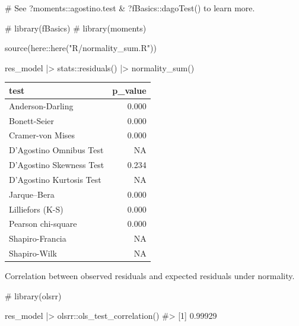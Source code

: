 \documentclass[
  12pt,
  a4paper,
  oneside]{tesesusp}
\newenvironment{Shaded}{\begin{snugshade}}{\end{snugshade}}
\newcommand{\CommentTok}[1]{\textcolor[rgb]{0.37,0.37,0.37}{#1}}
\newcommand{\FunctionTok}[1]{\textcolor[rgb]{0.28,0.35,0.67}{#1}}
\newcommand{\NormalTok}[1]{\textcolor[rgb]{0.00,0.23,0.31}{#1}}
\newcommand{\SpecialCharTok}[1]{\textcolor[rgb]{0.37,0.37,0.37}{#1}}
\newcommand{\StringTok}[1]{\textcolor[rgb]{0.13,0.47,0.30}{#1}}
\begin{document}
\begin{Shaded}
\begin{Highlighting}[numbers=left,,]
\CommentTok{\# See \textasciigrave{}?moments::agostino.test\textasciigrave{} \& \textasciigrave{}?fBasics::dagoTest()\textasciigrave{} to learn more.}

\CommentTok{\# library(fBasics)}
\CommentTok{\# library(moments)}

\FunctionTok{source}\NormalTok{(here}\SpecialCharTok{::}\FunctionTok{here}\NormalTok{(}\StringTok{"R/normality\_sum.R"}\NormalTok{))}

\NormalTok{res\_model }\SpecialCharTok{|\textgreater{}}
\NormalTok{  stats}\SpecialCharTok{::}\FunctionTok{residuals}\NormalTok{() }\SpecialCharTok{|\textgreater{}}
  \FunctionTok{normality\_sum}\NormalTok{()}
\end{Highlighting}
\end{Shaded}

\begin{table}
\centering
\begin{tabular}{l|r}
\hline
test & p\_value\\
\hline
Anderson-Darling & 0.000\\
\hline
Bonett-Seier & 0.000\\
\hline
Cramer-von Mises & 0.000\\
\hline
D'Agostino Omnibus Test & NA\\
\hline
D'Agostino Skewness Test & 0.234\\
\hline
D'Agostino Kurtosis Test & NA\\
\hline
Jarque–Bera & 0.000\\
\hline
Lilliefors (K-S) & 0.000\\
\hline
Pearson chi-square & 0.000\\
\hline
Shapiro-Francia & NA\\
\hline
Shapiro-Wilk & NA\\
\hline
\end{tabular}
\end{table}

Correlation between observed residuals and expected residuals under
normality.

\begin{Shaded}
\begin{Highlighting}[numbers=left,,]
\CommentTok{\# library(olsrr)}

\NormalTok{res\_model }\SpecialCharTok{|\textgreater{}}\NormalTok{ olsrr}\SpecialCharTok{::}\FunctionTok{ols\_test\_correlation}\NormalTok{()}
\CommentTok{\#\textgreater{} [1] 0.99929}
\end{Highlighting}
\end{Shaded}
\end{document}
